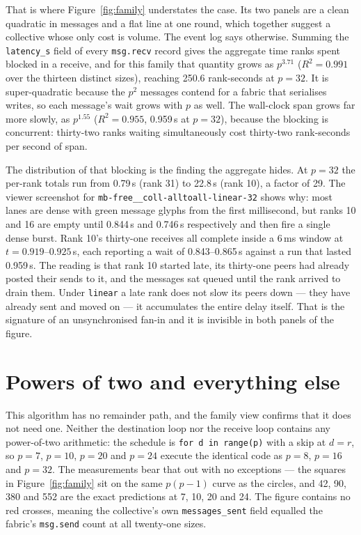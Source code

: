 \documentclass[11pt]{article}
\begin{document}
That is where Figure~\ref{fig:family} understates the case. Its two panels are a clean
quadratic in messages and a flat line at one round, which together suggest a collective whose
only cost is volume. The event log says otherwise. Summing the \texttt{latency\_s} field of
every \texttt{msg.recv} record gives the aggregate time ranks spent blocked in a receive, and
for this family that quantity grows as $p^{3.71}$ ($R^2 = 0.991$ over the thirteen distinct
sizes), reaching 250.6 rank-seconds at $p=32$. It is super-quadratic because the $p^2$
messages contend for a fabric that serialises writes, so each message's wait grows with $p$
as well. The wall-clock span grows far more slowly, as $p^{1.55}$ ($R^2=0.955$, 0.959\,s at
$p=32$), because the blocking is concurrent: thirty-two ranks waiting simultaneously cost
thirty-two rank-seconds per second of span.

The distribution of that blocking is the finding the aggregate hides. At $p=32$ the per-rank
totals run from 0.79\,s (rank 31) to 22.8\,s (rank 10), a factor of 29. The viewer screenshot
for \texttt{mb-free\_\_coll-alltoall-linear-32} shows why: most lanes are dense with green
message glyphs from the first millisecond, but ranks 10 and 16 are empty until 0.844\,s and
0.746\,s respectively and then fire a single dense burst. Rank 10's thirty-one receives all
complete inside a 6\,ms window at $t = 0.919$--$0.925$\,s, each reporting a wait of
0.843--0.865\,s against a run that lasted 0.959\,s. The reading is
that rank 10 started late, its thirty-one peers had already posted their sends to it, and the
messages sat queued until the rank arrived to drain them. Under \texttt{linear} a late rank
does not slow its peers down --- they have already sent and moved on --- it accumulates the
entire delay itself. That is the signature of an unsynchronised fan-in and it is invisible in
both panels of the figure.

\section{Powers of two and everything else}

This algorithm has no remainder path, and the family view confirms that it does not need one.
Neither the destination loop nor the receive loop contains any power-of-two arithmetic: the
schedule is \texttt{for d in range(p)} with a skip at $d = r$, so $p=7$, $p=10$, $p=20$ and
$p=24$ execute the identical code as $p=8$, $p=16$ and $p=32$. The measurements bear that out
with no exceptions --- the squares in Figure~\ref{fig:family} sit on the same $p(p-1)$ curve
as the circles, and 42, 90, 380 and 552 are the exact predictions at 7, 10, 20 and 24. The
figure contains no red crosses, meaning the collective's own \texttt{messages\_sent} field
equalled the fabric's \texttt{msg.send} count at all twenty-one sizes.
\end{document}
